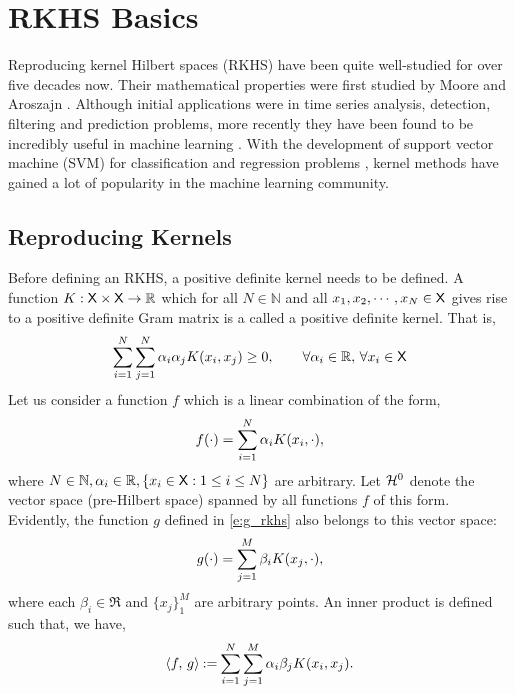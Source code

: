 \section{RKHS Basics}
\label{s:rkhs_basics}
Reproducing kernel Hilbert spaces (RKHS) have been quite well-studied for over five decades now. Their mathematical properties were first studied by Moore \cite{moo1916} and Aroszajn \cite{aro50}. Although initial applications were in time series analysis, detection, filtering and prediction problems, more recently they have been found to be incredibly useful in machine learning \cite{wah90}. With the development of support vector machine (SVM) for classification and regression problems \cite{corvap95, drucburkaufsmovap97}, kernel methods have gained a lot of popularity in the machine learning community. 

\subsection{Reproducing Kernels} 
Before defining an RKHS, a positive definite kernel needs to be defined. A function $K : {\sf X} \times {\sf X} \to \mathbb{R}$ which for all $N \in \mathbb{N}$ and all $x_1,x_2,\cdots,x_N \in {\sf X}$ gives rise to a positive definite Gram matrix is a called a positive definite kernel. That is, 
\begin{equation}
\sum_{i=1}^N \sum_{j=1}^N \alpha_i \alpha_j K(x_i,x_j) \geq 0, \qquad \forall \alpha_i \in \mathbb{R}, \, \forall x_i \in {\sf X} 
\end{equation}
Let us consider a function $f$ which is a linear combination of the form,
\begin{equation}
f(\cdot) = \sum_{i=1}^N \alpha_i \Kern(x_i, \cdot),
\label{e:f_rkhs}
\end{equation}
where $N \in \mathbb{N}, \alpha_i \in \mathbb{R}, \{ x_i \in {\sf X}: 1\leq i \leq N \}$ are arbitrary. Let ${\cal H}^0$ denote the vector space (pre-Hilbert space) spanned by all functions $f$ of this form. Evidently, the function $g$ defined in \eqref{e:g_rkhs} also belongs to this vector space:
\begin{equation}
g(\cdot) = \sum_{j=1}^M \beta_i \Kern(x_j, \cdot),
\label{e:g_rkhs}
\end{equation}
where each $\beta_i \in \Re$ and $\{x_j\}_1^M$ are arbitrary points.  An inner product is defined such that, we have,
\begin{equation}
\langle f,\, g \rangle \eqdef \sum_{i=1}^N \sum_{j=1}^M \alpha_i \beta_j \Kern(x_i, x_j).
\label{e:rkhs_inner_product}
\end{equation}
